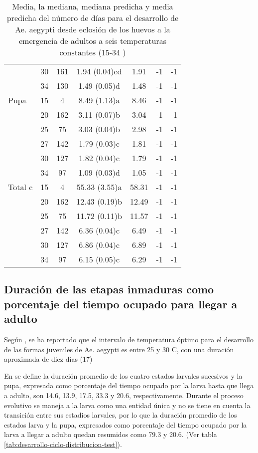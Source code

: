 \begin{table}
\begin{center}
\begin{tabular}{p{2cm} c c c c c c }
             & 30 & 161 & 1.94 (0.04)cd & 1.91  & -1 & -1\\ 
             & 34 & 130 & 1.49 (0.05)d  & 1.48  & -1 & -1\\ 
Pupa         & 15 & 4   & 8.49 (1.13)a  & 8.46  & -1 & -1\\ 
             & 20 & 162 & 3.11 (0.07)b  & 3.04  & -1 & -1\\ 
             & 25 & 75  & 3.03 (0.04)b  & 2.98  & -1 & -1\\ 
             & 27 & 142 & 1.79 (0.03)c  & 1.81  & -1 & -1\\  
             & 30 & 127 & 1.82 (0.04)c  & 1.79  & -1 & -1\\ 
             & 34 & 97  & 1.09 (0.03)d  & 1.05  & -1 & -1\\ 
Total c      & 15 & 4   & 55.33 (3.55)a & 58.31 & -1 & -1\\ 
             & 20 & 162 & 12.43 (0.19)b & 12.49 & -1 & -1\\ 
             & 25 & 75  & 11.72 (0.11)b & 11.57 & -1 & -1\\ 
             & 27 & 142 & 6.36 (0.04)c  & 6.49  & -1 & -1\\ 
             & 30 & 127 & 6.86 (0.04)c  & 6.89  & -1 & -1\\ 
             & 34 & 97  & 6.15 (0.05)c  & 6.29  & -1 & -1\\ 
\end{tabular}
\caption{ \label{tab:desarrollo-ciclo-temp-test} Media, la mediana, mediana predicha y media predicha
del número de días para el desarrollo de Ae. aegypti desde eclosión de los huevos a la emergencia de
adultos a seis temperaturas constantes (15-34 \textcelsius) \cite{rueda1990temperature}}
\end{center}
\end{table}


\subsection{Duración de las etapas inmaduras como porcentaje del tiempo ocupado para llegar a adulto}

Según \cite{manrique1998desarrollo}, se ha reportado que el intervalo de temperatura óptimo para el
desarrollo de las formas juveniles de Ae. aegypti es entre 25 y 30 C, con una duración aproximada de
diez días (17) 

En \cite{dengueUruguayCap2} se define la duración promedio de los cuatro estados larvales sucesivos y la
pupa, expresada como porcentaje del tiempo ocupado por la larva hasta que llega a adulto, son 14.6, 13.9,
17.5, 33.3 y 20.6, respectivamente. Durante el proceso evolutivo se maneja a la larva como una entidad
única y no se tiene en cuenta la transición entre sus estadios larvales, por lo que la duración promedio
de los estados larva y la pupa, expresados como porcentaje del tiempo ocupado por la larva a llegar a
adulto quedan resumidos como 79.3 y 20.6. (Ver tabla \ref{tab:desarrollo-ciclo-distribucion-test}).

